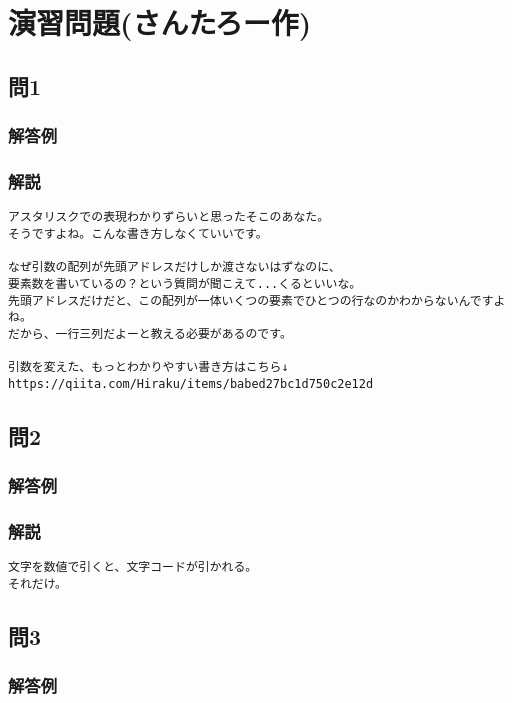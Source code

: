 \section{演習問題(さんたろー作)}
\subsection{問1}
\subsubsection{解答例}

\subsubsection{解説}
\begin{verbatim}
アスタリスクでの表現わかりずらいと思ったそこのあなた。
そうですよね。こんな書き方しなくていいです。

なぜ引数の配列が先頭アドレスだけしか渡さないはずなのに、
要素数を書いているの？という質問が聞こえて...くるといいな。
先頭アドレスだけだと、この配列が一体いくつの要素でひとつの行なのかわからないんですよね。
だから、一行三列だよーと教える必要があるのです。

引数を変えた、もっとわかりやすい書き方はこちら↓
https://qiita.com/Hiraku/items/babed27bc1d750c2e12d
\end{verbatim}

\subsection{問2}
\subsubsection{解答例}

\subsubsection{解説}
\begin{verbatim}
文字を数値で引くと、文字コードが引かれる。
それだけ。

\end{verbatim}

\subsection{問3}
\subsubsection{解答例}


